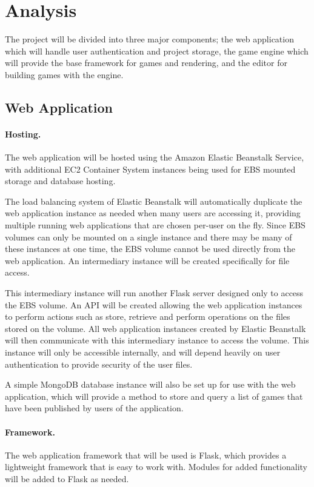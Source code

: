 \documentclass[a4paper, 12pt]{article}
\begin{document}
\section{Analysis}

The project will be divided into three major components; the web application which will handle user authentication and project storage, the game engine which will provide the base framework for games and rendering, and the editor for building games with the engine.

\subsection{Web Application}
\paragraph{Hosting.}
The web application will be hosted using the Amazon Elastic Beanstalk Service, with additional EC2 Container System instances being used for EBS mounted storage and database hosting.

The load balancing system of Elastic Beanstalk will automatically duplicate the web application instance as needed when many users are accessing it, providing multiple running web applications that are chosen per-user on the fly. Since EBS volumes can only be mounted on a single instance and there may be many of these instances at one time, the EBS volume cannot be used directly from the web application. An intermediary instance will be created specifically for file access. 

This intermediary instance will run another Flask server designed only to access the EBS volume. An API will be created allowing the web application instances to perform actions such as store, retrieve and perform operations on the files stored on the volume. All web application instances created by Elastic Beanstalk will then communicate with this intermediary instance to access the volume. This instance will only be accessible internally, and will depend heavily on user authentication to provide security of the user files.

A simple MongoDB database instance will also be set up for use with the web application, which will provide a method to store and query a list of games that have been published by users of the application.

\paragraph{Framework.}
The web application framework that will be used is Flask, which provides a lightweight framework that is easy to work with. Modules for added functionality will be added to Flask as needed.
\end{document}
